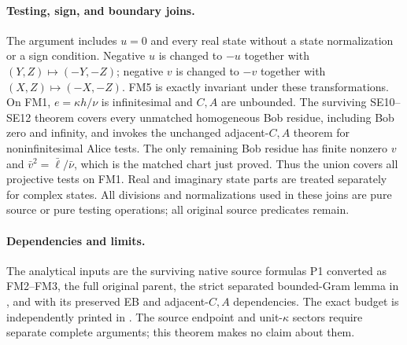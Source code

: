 \paragraph{Testing, sign, and boundary joins.}
The argument includes $u=0$ and every real state without a state
normalization or a sign condition. Negative $u$ is changed to
$-u$ together with $(Y,Z)\mapsto(-Y,-Z)$; negative $v$ is
changed to $-v$ together with $(X,Z)\mapsto(-X,-Z)$.
FM5 is exactly invariant under these transformations. On FM1,
$e=\kappa h/\nu$ is infinitesimal and $C,A$ are unbounded.
The surviving SE10--SE12 theorem covers every unmatched
homogeneous Bob residue, including Bob zero and infinity,
and invokes the unchanged adjacent-$C,A$ theorem for
noninfinitesimal Alice tests. The only remaining Bob residue
has finite nonzero $v$ and $\bar v^2=\bar\ell/\bar\nu$,
which is the matched chart just proved. Thus the union covers
all projective tests on FM1. Real and imaginary state parts
are treated separately for complex states. All divisions and
normalizations used in these joins are pure source or pure
testing operations; all original source predicates remain.

\paragraph{Dependencies and limits.}
The analytical inputs are the surviving native source formulas
P1 converted as FM2--FM3, the full original parent, the strict
separated bounded-Gram lemma in ,
and 
with its preserved EB and adjacent-$C,A$ dependencies.
The exact budget is independently printed in
. The source endpoint
and unit-$\kappa$ sectors require separate complete arguments;
this theorem makes no claim about them.
